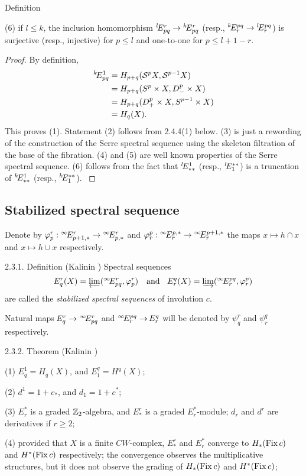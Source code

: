 \documentclass{article}
\begin{document}
\begin{subsubsection}{ Definition}
\begin{proclaim}
{(6) if $l\le k$, the inclusion homomorphism
$\E l/r/pq/\to \E k/r/pq/$ (resp., $\E k/pq/r/\to \E l/pq/r/$)
is surjective (resp., injective) for $p\le l$ and
one-to-one for $p\le l+1-r$.
}\end{proclaim}
\begin{proof}{ By definition,
\begin{align}
\E k/1/pq/&=H_{p+q}(\CS^pX,\CS^{p-1}X)\\
&=H_{p+q}(S^p\tm X,D_-^p\tm X)\\
&=H_{p+q}(D_+^p\tm X,S^{p-1}\tm X)\\
&=H_q(X).
\end{align}
This proves (1). Statement (2) follows from 2.4.4(1) below.
(3) is just a rewording of the construction of the Serre spectral sequence
using the skeleton filtration of the base of the fibration.
(4) and (5) are well known properties of the Serre spectral
sequence. (6) follows from the fact that $\E l/1/**/$
(resp., $\E l/**/1/$) is a truncation of $\E k/1/**/$
(resp., $\E k/**/1/$). 
}\end{proof}
\subsection{Stabilized spectral sequence }
Denote by $\f_p^r:\E\infty/r/p+1,*/\to\E\infty/r/p,*/$ and
$\f_r^p:\E\infty/p,*/r/\to\E\infty/p+1,*/r/$ the maps
$x\mapsto h\cap x$ and $x\mapsto h\cup x$ respectively.
\begin{definition}{{2.3.1. Definition \rm(Kalinin \cite{5})}
Spectral sequences
$$\E/r/q/(X)=\varprojlim(\E\infty/r/pq/,\f_p^r)\quad
\text{and}\quad\E/q/r/(X)=\varinjlim(\E\infty/pq/r/,\f_r^p)
$$
are called the {\it stabilized spectral sequences\/} of involution $c$.
}\end{definition}

Natural maps $\E/r/q/\to\E\infty/r/pq/$ and $\E\infty/pq/r/\to\E/q/r/$
will be denoted by $\psi_q^r$ and $\psi_r^q$ respectively.
\begin{proclaim}{{2.3.2. Theorem \rm (Kalinin \cite{5})}

(1) $E_q^1=H_q(X)$, and $E_1^q=H^q(X)$;

(2) $d^1=1+c_*$, and $d_1=1+c^*$;

(3) $E_r^*$ is a graded $\mathbb Z_2$-algebra, and $E_*^r$ is a graded
$E_r^*$-module; $d_r$ and $d^r$ are derivatives if $r\ge2$;

(4) provided that $X$ is a finite $CW$-complex,
$E_*^r$ and $E_r^*$ converge to $H_*(\operatorname{Fix} c)$ and $H^*(\operatorname{Fix} c)$
respectively; the convergence observes the multiplicative structures,
but it does not observe the grading of $H_*(\operatorname{Fix} c)$ and $H^*(\operatorname{Fix} c)$;

}
\end{proclaim}
\end{subsubsection}
\end{document}
